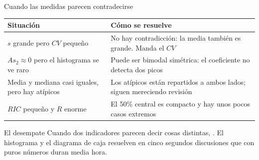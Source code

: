 \documentclass[aspectratio=169,10pt]{beamer}
\begin{document}
\begin{frame}{Cuando las medidas parecen contradecirse}
  \scriptsize
  \begin{center}
  \begin{tabular}{@{}p{4.4cm}p{7.4cm}@{}}
    \toprule
    \textbf{Situación} & \textbf{Cómo se resuelve} \\
    \midrule
    $s$ grande pero $CV$ pequeño &
      No hay contradicción: la media también es grande. Manda el $CV$ \\
    \addlinespace
    $As_2 \approx 0$ pero el histograma se ve raro &
      Puede ser bimodal simétrica: el coeficiente no detecta dos picos \\
    \addlinespace
    Media y mediana casi iguales, pero hay atípicos &
      Los atípicos están repartidos a ambos lados; siguen mereciendo revisión \\
    \addlinespace
    $RIC$ pequeño y $R$ enorme &
      El 50\% central es compacto y hay unos pocos casos extremos \\
    \bottomrule
  \end{tabular}
  \end{center}

  \vspace{0.1cm}
  \begin{alertblock}{El desempate}
    \scriptsize
    Cuando dos indicadores parecen decir cosas distintas, . El histograma y el diagrama de caja resuelven en cinco segundos
    discusiones que con puros números duran media hora.
  \end{alertblock}
\end{frame}
\end{document}
